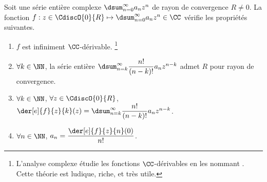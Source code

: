 

\begin{preli} \label{der-power-serie}
    Soit une série entière complexe $\dsum_{n=0}^{\infty} a_n z^n$ de rayon de convergence $R \neq 0$.
    La fonction $f: z \in \CdiscO{0}{R} \mapsto \dsum_{n=0}^{\infty} a_n z^n \in \CC$ vérifie les propriétés suivantes.
    \begin{enumerate}
    	\item $f$ est infiniment $\CC$-dérivable.%
		\footnote{
			L'analyse complexe étudie les fonctions $\CC$-dérivables en les nommant .
			Cette théorie est ludique, riche, et très utile.
		}

    	\item $\forall k \in \NN$,
		la série entière $\dsum_{n = k}^{\infty} \dfrac{n!}{(n-k)!} a_n z^{n - k}$ admet $R$ pour rayon de convergence.

    	\item $\forall k \in \NN$, $\forall z \in \CdiscO{0}{R}$,
		$\der[e]{f}{z}{k}(z) = \dsum_{n = k}^{\infty} \dfrac{n!}{(n-k)!} a_n z^{n - k}$.

    	\item \label{a_n-value}
		$\forall n \in \NN$,  $a_n = \dfrac{\der[e]{f}{z}{n}(0)}{n!}$.
    \end{enumerate}
\end{preli}


